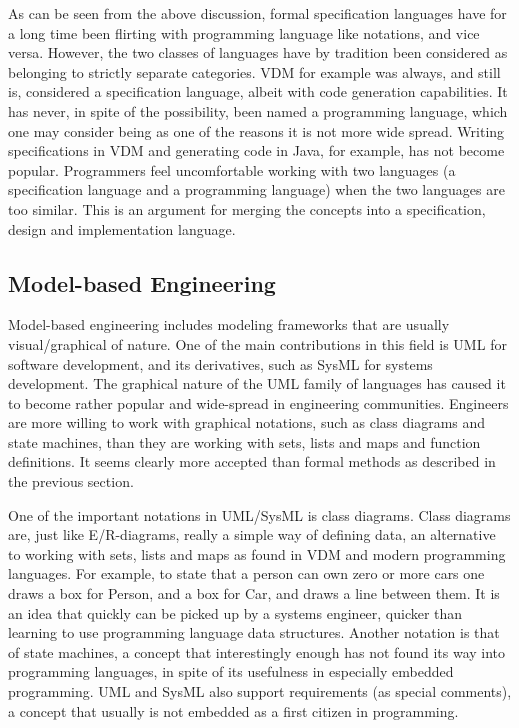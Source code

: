 As can be seen from the above discussion, formal specification 
languages have for a long time been flirting with programming 
language like notations, and vice versa. However, the two classes of languages have by tradition been considered as belonging to 
strictly separate categories. VDM for example was always, and still 
is, considered a specification language, albeit with code 
generation capabilities. It has never, in spite of the possibility, 
been named a programming language, which one may 
consider being as one of the reasons it is not more wide spread. 
Writing specifications in VDM and generating code in Java, for 
example, has not become popular. Programmers feel uncomfortable 
working with two languages (a specification language and  a 
programming language) when the two languages are too similar. This 
is an argument for merging the concepts into a  specification, 
design and implementation language.


\subsection{Model-based Engineering}

Model-based engineering includes modeling frameworks that are 
usually visual/graphical of nature. One of the main contributions 
in this field is UML \cite{uml} for software development, and its 
derivatives, such as SysML \cite{sysml} for systems development. 
The graphical nature of the 
UML family of languages has caused it to become rather popular and 
wide-spread in engineering communities. Engineers are more willing 
to work with graphical notations, such as 
class diagrams and state machines, than they are working with sets, 
lists and maps and function definitions. It seems clearly more 
accepted than formal methods as described in the previous section. 

One of the important notations in UML/SysML is class diagrams. 
Class diagrams are, just like E/R-diagrams, really a simple way 
of defining data, an alternative to working with sets, lists and 
maps as found in VDM and modern programming languages. For example, 
to state that a person can own zero or more cars one draws a box 
for Person, and a box for Car, and draws a line between them. It is 
an idea that quickly can be picked up by a systems engineer, 
quicker than learning to use programming language data structures. 
Another notation is that of state 
machines, a concept that interestingly enough has not found its way 
into programming languages, in spite of its usefulness in 
especially embedded programming. UML and SysML also support 
requirements (as special comments), a concept that usually is not embedded as a first citizen in programming. 

